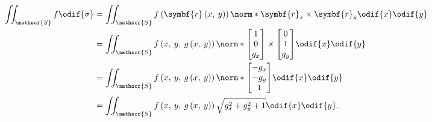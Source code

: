\documentclass{article}
\begin{document}
\begin{align*}
    \iint_{\mathscr{S}} f \odif{\sigma} & = \iint_{\mathscr{S}} f\left( \symbf{r}\left( x,\: y \right) \right) \norm*{\symbf{r}_x \times \symbf{r}_y} \odif{x} \odif{y} \\
                                        & = \iint_{\mathscr{S}} f\left( x,\: y,\: g\left( x,\: y \right) \right) \norm*{
        \begin{bmatrix}
            1 \\
            0 \\
            g_x
        \end{bmatrix}
        \times
        \begin{bmatrix}
            0 \\
            1 \\
            g_y
        \end{bmatrix}
    } \odif{x} \odif{y}                                                                                                                                                 \\
                                        & = \iint_{\mathscr{S}} f\left( x,\: y,\: g\left( x,\: y \right) \right) \norm*{
        \begin{bmatrix}
            -g_x \\
            -g_y \\
            1
        \end{bmatrix}
    } \odif{x} \odif{y}                                                                                                                                                 \\
                                        & = \iint_{\mathscr{S}} f\left( x,\: y,\: g\left( x,\: y \right) \right) \sqrt{g_x^2 + g_y^2 + 1} \odif{x} \odif{y}.
\end{align*}
\end{document}
